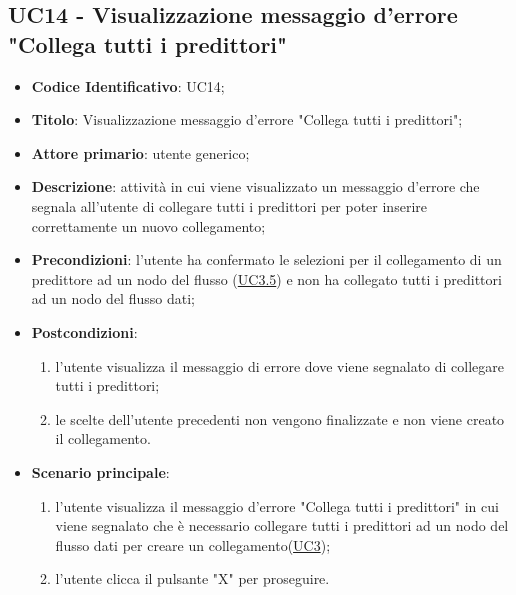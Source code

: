 	\subsection{UC14 - Visualizzazione messaggio d'errore "Collega tutti i predittori"}
		\begin{itemize}
			\item\textbf{Codice Identificativo}: UC14;
			\item\textbf{Titolo}: Visualizzazione messaggio d'errore "Collega tutti i predittori";
			\item\textbf{Attore primario}: utente generico;
			\item\textbf{Descrizione}: attività in cui viene visualizzato un messaggio d'errore che segnala all'utente di collegare tutti i predittori per poter inserire correttamente un nuovo collegamento;
			\item\textbf{Precondizioni}: l'utente ha confermato le selezioni per il collegamento di un predittore ad un nodo del flusso (\hyperref[par:UC3.5]{UC3.5}) e non ha collegato tutti i predittori ad un nodo del flusso dati;
			\item\textbf{Postcondizioni}: 
				\begin{enumerate}
					\item l'utente visualizza il messaggio di errore dove viene segnalato di collegare tutti i predittori;
					\item le scelte dell'utente precedenti non vengono finalizzate e non viene creato il collegamento.
				\end{enumerate}		
			\item\textbf{Scenario principale}:
				\begin{enumerate}
					\item l'utente visualizza il messaggio d'errore "Collega tutti i predittori" in cui viene segnalato che è necessario collegare tutti i predittori ad un nodo del flusso dati per creare un collegamento(\hyperref[par:UC3]{UC3});
					\item l'utente clicca il pulsante "X" per proseguire.		
				\end{enumerate}		
		\end{itemize}


		\label{par:UC15}
